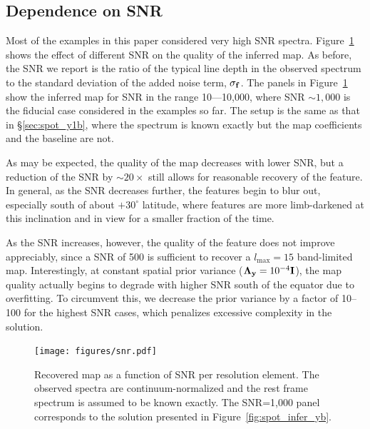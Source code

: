 \documentclass[modern]{aastex631}
\begin{document}
\subsection{Dependence on SNR}
\label{sec:snr}
%
Most of the examples in this paper considered very high SNR spectra.
Figure~\ref{fig:snr} shows the effect of different SNR on the quality of the inferred map. 
As before, the SNR we report is the ratio of the typical line depth in the observed spectrum to the standard deviation of the added noise term, $\sigma_{\mathbf{f}}$.
The panels in Figure~\ref{fig:snr} show the inferred map for SNR in the range 10---10,000, where SNR $\sim 1,000$ is the fiducial case considered in the examples so far. 
The setup is the same as that in \S\ref{sec:spot_y1b}, where the spectrum is known exactly but the map coefficients and the baseline are not.

As may be expected, the quality of the map decreases with lower SNR, but a reduction of the SNR by $\sim 20\times$ still allows for reasonable recovery of the \spot feature. 
In general, as the SNR decreases further, the features begin to blur out, especially south of about $+30^\circ$ latitude, where features are more limb-darkened at this inclination and in view for a smaller fraction of the time.

As the SNR increases, however, the quality of the \spot feature does not improve appreciably, since a SNR of 500 is sufficient to recover a $l_\mathrm{max} = 15$ band-limited map. 
Interestingly, at constant spatial prior variance ($\boldsymbol{\Lambda}_{\mathbf{y}} = 10^{-4}{\mathbf{I}}$), the map quality actually begins to degrade with higher SNR south of the equator due to overfitting.
To circumvent this, we decrease the prior variance by a factor of 10--100 for the highest SNR cases, which penalizes excessive complexity in the solution.

%
\begin{figure}[t!]
    \begin{centering}
        \texttt{[image: figures/snr.pdf]}
        \caption{%
            Recovered \spot map as a function of SNR per resolution element. 
            The observed spectra are continuum-normalized and the rest frame spectrum is assumed to be known exactly.
            The SNR=1,000 panel corresponds to the solution presented in Figure~\ref{fig:spot_infer_yb}.
        }
        \label{fig:snr}
    \end{centering}
\end{figure}
\end{document}
